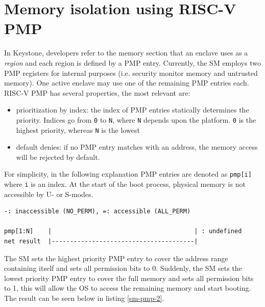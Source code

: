 \section{Memory isolation using RISC-V PMP}
In Keystone, developers refer to the memory section that an enclave uses as a \textit{region} and each region is defined by a PMP entry. Currently, the SM employs two PMP registers for internal purposes (i.e. security monitor memory and untrusted memory). One active enclave may use one of the remaining PMP entries each. RISC-V PMP has several properties, the most relevant are: 
\begin{itemize}
    \item prioritization by index: the index of PMP entries statically determines the priority. Indices go from \texttt{0} to \texttt{N}, where \texttt{N} depends upon the platform. \texttt{0} is the highest priority, whereas \texttt{N} is the lowest 
    \item default denies: if no PMP entry matches with an address, the memory access will be rejected by default.
\end{itemize}
For simplicity, in the following explanation PMP entries are denoted as \texttt{pmp[i]} where \texttt{i} is an index. At the start of the boot process, physical memory is not accessible by U- or S-modes. \\

\begin{lstlisting}[frame=single,showspaces=true,caption={Memory state when booting start \cite{keystone-doc}},captionpos=b,label={sm-pmp-1}]
-: inaccessible (NO_PERM), =: accessible (ALL_PERM)

pmp[1:N]    |                                       | : undefined
net result  |---------------------------------------|   
\end{lstlisting}
\noindent
The SM sets the highest priority PMP entry to cover the address range containing itself and sets all permission bits to 0. Suddenly, the SM sets the lowest priority PMP entry to cover the full memory and sets all permission bits to 1, this will allow the OS to access the remaining memory and start booting. The result can be seen below in listing \ref{sm-pmp-2}. \\

